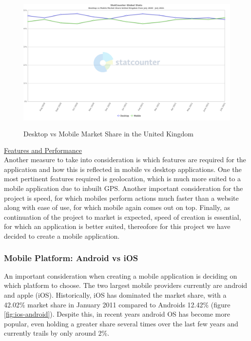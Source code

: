 \documentclass[12pt]{article}
\begin{document}
	\begin{figure}[H]
		\centering
		\includegraphics[scale=0.45]{images/GB-mobile-desktop.png}
		\caption{Desktop vs Mobile Market Share in the United Kingdom}
		\label{fig:uk-mobile-desktop}
		\cite{DesktopVsMobile2021a}
	\end{figure}

	\noindent
	\underline{Features and Performance}
	\\
	\noindent
	Another measure to take into consideration is which features are required for the application and how this is reflected in mobile vs desktop applications. One the most pertinent features required is geolocation, which is much more suited to a mobile application due to inbuilt GPS. Another important consideration for the project is speed, for which mobiles perform actions much faster than a website along with ease of use, for which mobile again comes out on top. Finally, as continuation of the project to market is expected, speed of creation is essential, for which an application is better suited, thereofore for this project we have decided to create a mobile application.

	
	\subsubsection{Mobile Platform: Android vs iOS}
	An important consideration when creating a mobile application is deciding on which platform to choose. The two largest mobile providers currently are android and apple (iOS). Historically, iOS has dominated the market share, with a 42.02\% market share in January 2011 compared to Androids 12.42\% (figure \ref{fig:ios-android}). Despite this, in recent years android OS has become more popular, even holding a greater share several times over the last few years and currently trails by only around 2\%.
	
\end{document}
